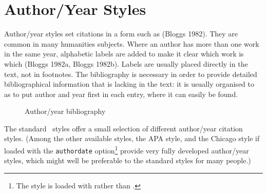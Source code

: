 \section{Author/Year Styles}

Author/year styles set citations in a form such as (Bloggs 1982). They
are common in many humanities subjects. Where an author has more
than one work in the same year, alphabetic labels are added to make it
clear which work is which (Bloggs 1982a, Bloggs 1982b). Labels are
usually placed directly in the text, not in footnotes. The
bibliography is necessary in order to provide detailed
bibliographical information that is lacking in the text: it is usually
organised to as to put author and year first in each entry, where it
can easily be found.

\begin{figure}
\caption{Author/year bibliography\label{example:bibliography:authoryear}}
\end{figure}

 The standard
\biblatex\ styles offer a small selection of different author/year
citation styles. (Among the other available styles, the APA style, and
the Chicago style if loaded with the \verb|authordate|
option\footnote{The  style is loaded with
   rather than
  .} provide very fully
developed author/year styles, which might well be preferable to the
standard styles for many people.)

